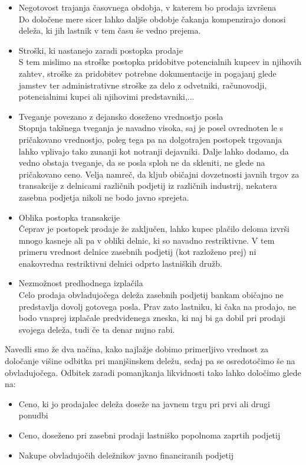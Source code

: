 \documentclass[12pt,a4paper]{amsart}
\theoremstyle{definition} %
\theoremstyle{plain} %
\begin{document}
\begin{itemize}
\item Negotovost trajanja časovnega obdobja, v katerem bo prodaja izvršena\\
Do določene mere sicer lahko daljše obdobje čakanja kompenzirajo donosi deleža, ki jih lastnik v tem času še vedno prejema.
\item Stroški, ki nastanejo zaradi postopka prodaje\\
S tem mislimo na stroške postopka pridobitve potencialnih kupcev in njihovih zahtev, stroške za pridobitev potrebne dokumentacije in pogajanj glede jamstev ter administrativne stroške za delo z odvetniki, računovodji, potencialnimi kupci ali njihovimi predstavniki,...
\item Tveganje povezano z dejansko doseženo vrednostjo posla\\
Stopnja takšnega tveganja je navadno visoka, saj je posel ovrednoten le s pričakovano vrednostjo, poleg tega pa na dolgotrajen postopek trgovanja lahko vplivajo tako zunanji kot notranji dejavniki. Dalje lahko dodamo, da vedno obstaja tveganje, da se posla sploh ne da skleniti, ne glede na pričakovano ceno. Velja namreč, da kljub običajni dovzetnosti javnih trgov za transakcije z delnicami različnih podjetij iz različnih industrij, nekatera zasebna podjetja nikoli ne bodo javno sprejeta.
\item Oblika postopka transakcije\\
Čeprav je postopek prodaje že zaključen, lahko kupec plačilo deloma izvrši mnogo kasneje ali pa v obliki delnic, ki so navadno restriktivne. V tem primeru vrednost delnice zasebnih podjetij (kot razloženo prej) ni enakovredna restriktivni delnici odprto lastniških družb.
\item Nezmožnost predhodnega izplačila\\
Celo prodaja obvladujočega deleža zasebnih podjetij bankam običajno ne predstavlja dovolj gotovega posla. Prav zato lastniku, ki čaka na prodajo, ne bodo vnaprej izplačale predvidenega zneska, ki naj bi ga dobil pri prodaji svojega deleža, tudi če ta denar nujno rabi.
\end{itemize}
Navedli smo že dva načina, kako najlažje dobimo primerljivo vrednost za določanje višine odbitka pri manjšinskem deležu, sedaj pa se osredotočimo še na obvladujočega. Odbitek zaradi pomanjkanja likvidnosti tako lahko določimo glede na:
\begin{itemize}
\item Ceno, ki jo prodajalec deleža doseže na javnem trgu pri prvi ali drugi ponudbi 
\item Ceno, doseženo pri zasebni prodaji lastniško popolnoma zaprtih podjetij
\item Nakupe obvladujočih deležnikov javno financiranih podjetij
\end{itemize}
\end{document}

